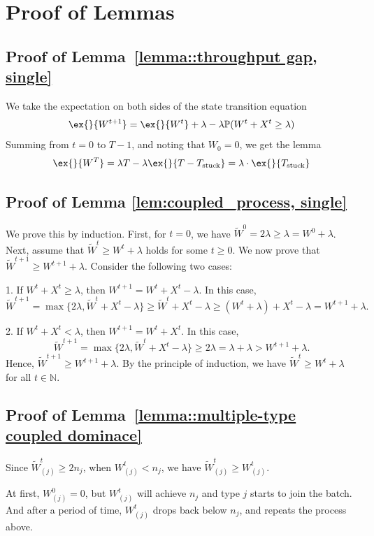 \section{Proof of Lemmas}\label{sec:pf_lemmas}
\subsection{Proof of Lemma~\ref{lemma::throughput gap, single}}\label{appendix_lemma::proof of throughput gap, single}
We take the expectation on both sides of the state transition equation
$$\ex{}{W^{t+1}}=\ex{}{W^t}+\lambda - \lambda \mathbb{P}(W^t+X^t\geq \lambda)$$
Summing from $t=0$ to $T-1$, and noting that $W_0=0$, we get the lemma
$$\ex{}{W^T}=\lambda T - \lambda \ex{}{T-T_{\text{stuck}}}=\lambda\cdot \ex{}{T_{\text{stuck}}}$$

\subsection{Proof of Lemma \ref{lem:coupled_process, single}}\label{appendix_lemma::proof of coupled_process, single}
We prove this by induction. First, for $t = 0$, we have $\tilde{W}^0=2\lambda\geq \lambda=W^0+\lambda$. Next, assume that $\tilde{W}^t \geq W^t + \lambda$ holds for some $t \geq 0$. We now prove that $\tilde{W}^{t+1} \geq W^{t+1} + \lambda$. Consider the following two cases:

1. If $W^t + X^t \geq \lambda$, then $W^{t+1} = W^t + X^t - \lambda$. In this case,
$$\tilde{W}^{t+1}=\max\{ 2\lambda, \tilde{W}^t + X^t - \lambda \}\geq \tilde{W}^t + X^t - \lambda\geq( W^t+\lambda )+ X^t - \lambda=W^{t+1}+\lambda.$$

2. If $W^t + X^t < \lambda$, then $W^{t+1} = W^t + X^t$. In this case,
$$\tilde{W}^{t+1}=\max\{ 2\lambda, \tilde{W}^t + X^t - \lambda \}\geq 2\lambda = \lambda+\lambda>W^{t+1}+\lambda.$$
Hence, $\tilde{W}^{t+1} \geq W^{t+1} + \lambda$. By the principle of induction, we have $\tilde{W}^t \geq W^t + \lambda$ for all $t \in \mathbb{N}$.

\subsection{Proof of Lemma~\ref{lemma::multiple-type coupled dominace}}\label{appendix_lemma::proof of multiple-type coupled dominace}
Since $\tilde{W}_{(j)}^t\geq 2n_j$, when $W^t_{(j)}< n_j$, we have $\tilde{W}_{(j)}^t\geq W^t_{(j)}$.

At first, $W^0_{(j)}=0$, but $W^t_{(j)}$ will achieve $n_j$ and type $j$ starts to join the batch. And after a period of time, $W^t_{(j)}$ drops back below $n_j$, and repeats the process above.

